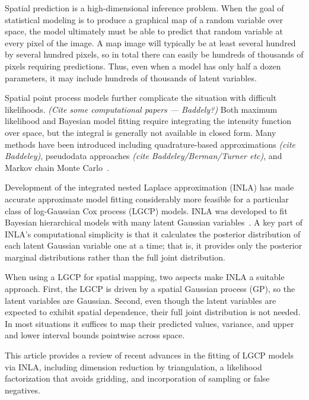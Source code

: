 \documentclass[]{interact}
\begin{document}

Spatial prediction is a high-dimensional inference problem. When the goal of
statistical modeling is to produce a graphical map of a random variable over
space, the model ultimately must be able to predict that random variable at
every pixel of the image. A map image will typically be at least several
hundred by several hundred pixels, so in total there can easily be hundreds of
thousands of pixels requiring predictions. Thus, even when a model has only
half a dozen parameters, it may include hundreds of thousands of latent
variables.

Spatial point process models further complicate the situation with difficult
likelihoods. {\it (Cite some computational papers --- Baddely?)} Both maximum
likelihood and Bayesian model fitting require integrating the intensity
function over space, but the integral is generally not available in closed
form. Many methods have been introduced including quadrature-based
approximations {\it (cite Baddeley)}, pseudodata approaches
{\it (cite Baddeley/Berman/Turner etc)}, and Markov chain Monte
Carlo~\cite{moellerwaagepetersen}.

Development of the integrated nested Laplace approximation (INLA) has made
accurate approximate model fitting considerably more feasible for a particular
class of log-Gaussian Cox process (LGCP) models. INLA was developed to fit
Bayesian hierarchical models with many latent Gaussian
variables~\cite{rueetal}. A key part of INLA's computational simplicity is that
it calculates the posterior distribution of each latent Gaussian variable one
at a time; that is, it provides only the posterior marginal distributions
rather than the full joint distribution.

When using a LGCP for spatial mapping, two aspects make INLA a suitable
approach. First, the LGCP is driven by a spatial Gaussian process (GP), so the
latent variables are Gaussian. Second, even though the latent variables are
expected to exhibit spatial dependence, their full joint distribution is not
needed. In most situations it suffices to map their predicted values, variance,
and upper and lower interval bounds pointwise across space.

This article provides a review of recent advances in the fitting of LGCP models
via INLA, including dimension reduction by triangulation, a likelihood
factorization that avoids gridding, and incorporation of sampling or false
negatives.
\end{document}
